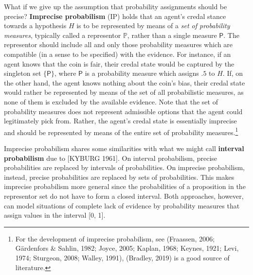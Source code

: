 \documentclass[
  10pt,
  dvipsnames,enabledeprecatedfontcommands]{scrartcl}
\begin{document}
What if we give up the assumption that probability assignments should be
precise? \textbf{Imprecise probabilism} (\textsf{IP}) holds that an
agent's credal stance towards a hypothesis \(H\) is to be represented by
means of a \emph{set of probability measures}, typically called a
representor \(\mathbb{P}\), rather than a single measure \(\mathsf{P}\).
The representor should include all and only those probability measures
which are compatible (in a sense to be specified) with the evidence. For
instance, if an agent knows that the coin is fair, their credal state
would be captured by the singleton set \(\{\mathsf{P}\}\), where
\(\mathsf{P}\) is a probability measure which assigns \(.5\) to \(H\).
If, on the other hand, the agent knows nothing about the coin's bias,
their credal state would rather be represented by means of the set of
all probabilistic measures, as none of them is excluded by the available
evidence. Note that the set of probability measures does not represent
admissible options that the agent could legitimately pick from. Rather,
the agent's credal state is essentially imprecise and should be
represented by means of the entire set of probability
measures.\footnote{For the development of imprecise probabilism, see
  (Fraassen, 2006; Gärdenfors \& Sahlin, 1982; Joyce, 2005; Kaplan,
  1968; Keynes, 1921; Levi, 1974; Sturgeon, 2008; Walley, 1991),
  (Bradley, 2019) is a good source of literature.}

Imprecise probabilism shares some similarities with what we might call
\textbf{interval probabilism} due to {[}KYBURG
1961{]}.
On interval probabilism, precise probabilities are replaced by intervals
of probabilities. On imprecise probabilism, instead, precise
probabilities are replaced by sets of probabilities. This makes
imprecise probabilism more general since the probabilities of a
proposition in the representor set do not have to form a closed
interval. Both approaches, however, can model situations of complete
lack of evidence by probability measures that assign values in the
interval {[}0, 1{]}.
\end{document}
